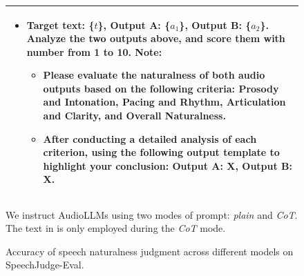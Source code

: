 \documentclass[]{bytedance_seed}
\begin{document}
\begin{figure}[t]
\begin{minipage}[t]{0.36\textwidth}
\begin{table}[H]
{\begin{threeparttable}
\begin{tabularx}{\linewidth}{X}
\begin{framed}
\begin{itemize}[itemsep=0ex,leftmargin=2ex]
                \item Target text: \{$t$\}, Output A: \{$a_1$\}, Output B: \{$a_2$\}. Analyze the two outputs above, and score them with number from 1 to 10. Note:
                \vspace{-1mm}
                \begin{itemize}[label=$\circ$,itemsep=0ex,leftmargin=4ex]
                    \item  \textcolor{yushunblue}{Please evaluate the naturalness of both audio outputs based on the following criteria: Prosody and Intonation, Pacing and Rhythm, Articulation and Clarity, and Overall Naturalness.}
                    \item \textcolor{yushunblue}{After conducting a detailed analysis of each criterion,} using the following output template to highlight your conclusion: Output A: X, Output B: X.
                \end{itemize}
            \end{itemize}
            \end{framed}
            \\ \bottomrule
          \end{tabularx}
        \begin{tablenotes}
            \footnotesize{
                \item[*] We instruct AudioLLMs using two modes of prompt: \textit{plain} and \textit{CoT}. The text in \textcolor{yushunblue}{} is only employed during the \textit{CoT} mode.
            }
        \end{tablenotes}
    \end{threeparttable}    
    }   
    \end{table}
  \end{minipage}
  \hfill
  \begin{minipage}[t]{0.60\textwidth}
    \begin{table}[H]
    \caption{Accuracy of speech naturalness judgment across different models on SpeechJudge-Eval.}
    \vspace{-3mm}
    \label{tab:eval-benchmark}
    \centering
    \resizebox{\textwidth}{!}{%
    \begin{threeparttable}

\end{threeparttable}}
\end{table}
\end{minipage}
\end{figure}
\end{document}
